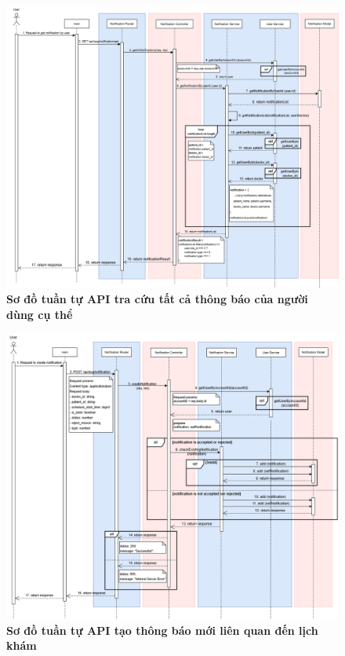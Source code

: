 \begin{figure}[H]
	\centering
	\includegraphics[width=16cm]{Images/api_sequence/noti/getNotificationByUserId.drawio.png}
	\caption[Sơ đồ tuần tự API tra cứu tất cả thông báo của người dùng cụ thể]{\bfseries \fontsize{12pt}{0pt}\selectfont Sơ đồ tuần tự API tra cứu tất cả thông báo của người dùng cụ thể}
	\label{sequence_diagram_get_notification_by_user}
\end{figure}
\begin{figure}[H]
	\centering
	\includegraphics[width=16cm]{Images/api_sequence/noti/createNotification.drawio.png}
	\caption[Sơ đồ tuần tự API tạo thông báo mới liên quan đến lịch khám]{\bfseries \fontsize{12pt}{0pt}\selectfont Sơ đồ tuần tự API tạo thông báo mới liên quan đến lịch khám}
	\label{sequence_diagram_create_notification}
\end{figure}

